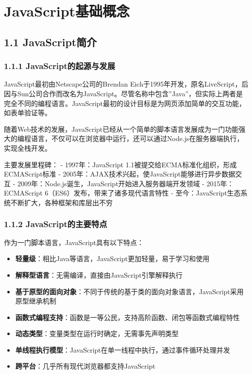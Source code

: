 \section{JavaScript基础概念}\label{javascriptux57faux7840ux6982ux5ff5}

\subsection{1.1 JavaScript简介}\label{javascriptux7b80ux4ecb}

\subsubsection{1.1.1
JavaScript的起源与发展}\label{javascriptux7684ux8d77ux6e90ux4e0eux53d1ux5c55}

JavaScript最初由Netscape公司的Brendan
Eich于1995年开发，原名LiveScript，后因与Sun公司合作而改名为JavaScript。尽管名称中包含''Java''，但实际上两者是完全不同的编程语言。JavaScript最初的设计目标是为网页添加简单的交互功能，如表单验证等。

随着Web技术的发展，JavaScript已经从一个简单的脚本语言发展成为一门功能强大的编程语言，不仅可以在浏览器中运行，还可以通过Node.js在服务器端执行，实现全栈开发。

主要发展里程碑： - 1997年：JavaScript
1.1被提交给ECMA标准化组织，形成ECMAScript标准 -
2005年：AJAX技术兴起，使JavaScript能够进行异步数据交互 -
2009年：Node.js诞生，JavaScript开始进入服务器端开发领域 -
2015年：ECMAScript 6（ES6）发布，带来了诸多现代语言特性 -
至今：JavaScript生态系统不断扩大，各种框架和库层出不穷

\subsubsection{1.1.2
JavaScript的主要特点}\label{javascriptux7684ux4e3bux8981ux7279ux70b9}

作为一门脚本语言，JavaScript具有以下特点：

\begin{itemize}
\tightlist
\item
  \textbf{轻量级}：相比Java等语言，JavaScript更加轻量，易于学习和使用
\item
  \textbf{解释型语言}：无需编译，直接由JavaScript引擎解释执行
\item
  \textbf{基于原型的面向对象}：不同于传统的基于类的面向对象语言，JavaScript采用原型继承机制
\item
  \textbf{函数式编程支持}：函数是一等公民，支持高阶函数、闭包等函数式编程特性
\item
  \textbf{动态类型}：变量类型在运行时确定，无需事先声明类型
\item
  \textbf{单线程执行模型}：JavaScript在单一线程中执行，通过事件循环处理并发
\item
  \textbf{跨平台}：几乎所有现代浏览器都支持JavaScript
\end{itemize}

